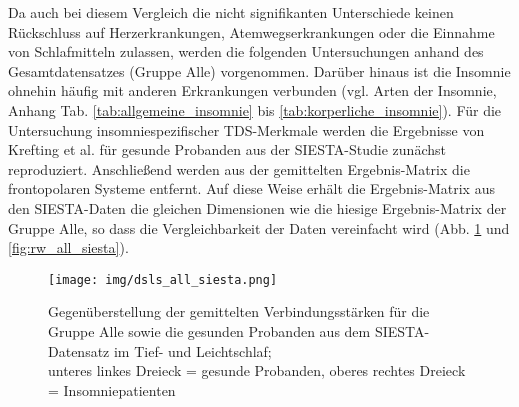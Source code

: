 Da auch bei diesem Vergleich die nicht signifikanten Unterschiede keinen Rückschluss auf Herzerkrankungen, Atemwegserkrankungen oder die Einnahme von Schlafmitteln zulassen, werden die folgenden Untersuchungen anhand des Gesamtdatensatzes (Gruppe Alle) vorgenommen. Darüber hinaus ist die Insomnie ohnehin häufig mit anderen Erkrankungen verbunden (vgl. Arten der Insomnie, Anhang Tab. \ref{tab:allgemeine_insomnie} bis \ref{tab:korperliche_insomnie}). Für die Untersuchung insomniespezifischer \acs{TDS}-Merkmale werden die Ergebnisse von Krefting et al. \parencite{krefting_age_2017} für gesunde Probanden aus der SIESTA-Studie \parencite{klosch_siesta_2001} zunächst reproduziert. Anschließend werden aus der gemittelten Ergebnis-Matrix die frontopolaren Systeme entfernt. Auf diese Weise erhält die Ergebnis-Matrix aus den SIESTA-Daten die gleichen Dimensionen wie die hiesige Ergebnis-Matrix der Gruppe Alle, so dass die Vergleichbarkeit der Daten vereinfacht wird (Abb. \ref{fig:dsls_all_siesta} und \ref{fig:rw_all_siesta}).\\


\begin{figure}[H]
	\centering
	\texttt{[image: img/dsls\_all\_siesta.png]}
	\caption[Verbindungsstärken für die Gruppe Alle und den SIESTA-Datensatz im Tief- und Leichtschlaf]{Gegenüberstellung der gemittelten Verbindungsstärken für die Gruppe Alle sowie die gesunden Probanden aus dem SIESTA-Datensatz im Tief- und Leichtschlaf;\\unteres linkes Dreieck = gesunde Probanden, oberes rechtes Dreieck = Insomniepatienten}
	\label{fig:dsls_all_siesta}
\end{figure}


